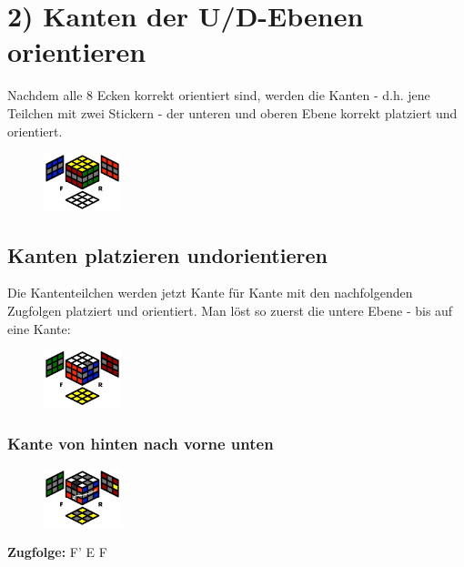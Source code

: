 \documentclass[letterpaper,10pt,twoside,twocolumn,openany]{book}
\begin{document}
\vspace{6mm}
\section{2) Kanten der U/D-Ebenen orientieren}
\begin{justify}
Nachdem alle 8 Ecken korrekt orientiert sind, werden die Kanten - d.h. jene Teilchen mit zwei Stickern - der unteren und oberen Ebene korrekt platziert und orientiert. 
\end{justify}
\begin{figure}[!htb] 
  \centering
     \includegraphics[width=0.20\textwidth]{img/set2solved.png}
\end{figure}

\subsection{Kanten platzieren und\newline orientieren}
\begin{justify}
Die Kantenteilchen werden jetzt Kante für Kante mit den nachfolgenden Zugfolgen platziert und orientiert. Man löst so zuerst die untere Ebene - bis auf eine Kante:
\begin{figure}[!htb] 
  \centering
     \includegraphics[width=0.20\textwidth]{img/single-gap-unsolved.png}
\end{figure}
\end{justify}

\newpage
\subsubsection{Kante von hinten nach vorne unten}
\begin{figure}[!htb] 
  \centering
     \includegraphics[width=0.20\textwidth]{img/hinten-rechts-vorne-unten.png}
\end{figure}
\centering \textbf{Zugfolge:} F' E F
\end{document}
